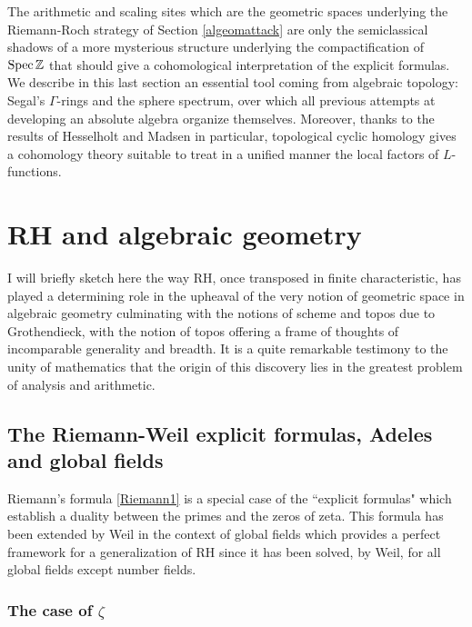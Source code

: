\documentclass[12pt]{article}
\def\Spec{{\rm Spec\,}}
\def\Z{{\mathbb Z}}
\def\vsp{\vspace{.05in}}
\begin{document}
\begin{itemize}
\vsp 
 The arithmetic and scaling sites which are the geometric spaces underlying the Riemann-Roch strategy of Section \ref{algeomattack} are only the semiclassical shadows of a more mysterious structure underlying the compactification of $\Spec\Z$ that should give a cohomological interpretation of the explicit formulas.  We describe in this last section an essential tool  coming from algebraic topology: Segal's $\Gamma$-rings and the sphere spectrum, over which all previous attempts at developing an absolute algebra organize themselves.  Moreover, thanks to the results of Hesselholt and Madsen in particular, topological cyclic homology gives a cohomology theory suitable to treat in a unified manner the local factors of $L$-functions.

\end{itemize}

\section{RH and algebraic geometry}
I will briefly sketch here the way RH, once transposed in finite characteristic, has played a determining role in the upheaval of the very notion of geometric space in algebraic geometry culminating with the notions of scheme and topos due to Grothendieck, with the notion of topos offering a frame of thoughts of incomparable generality and breadth. It is a  quite remarkable testimony to the unity of mathematics that the origin of this discovery lies in the greatest problem of analysis and arithmetic.

\subsection{The Riemann-Weil explicit formulas, Adeles and global fields}
\label{subsecrw}
Riemann's formula \eqref{Riemann1} is a special case of the ``explicit formulas" which establish a duality between the primes and the zeros of zeta. This formula has been extended by Weil in the context of global fields which provides a perfect framework for a generalization of RH since it has been solved, by Weil, for all global fields except number fields. 

\subsubsection{The case of $\zeta$}
\end{document}
